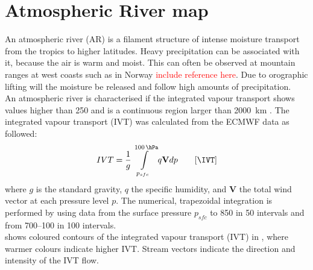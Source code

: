\section{Atmospheric River map}
\label{sec:atm_riv}

An atmospheric river (AR) is a filament structure of intense moisture transport from the tropics to higher latitudes. 
Heavy precipitation can be associated with it, because the air is warm and moist. This can often be observed at mountain ranges at west coasts such as in Norway \textcolor{red}{include reference here}. Due to orographic lifting will the moisture be released and follow high amounts of precipitation.  
\\
An atmospheric river is characterised if the integrated vapour transport shows values higher than \SI{250}{\IVT} and is a continuous region larger than \SI{2000}{\km} \citep{rutz_climatological_2014}.
The integrated vapour transport (IVT) was calculated from the ECMWF data as followed:
\begin{align}
IVT = \frac{1}{g} \int\limits_{p_{sfc}}^{\SI{100}{\hPa}} q \mathbf{V} dp \qquad [\SI{}{\IVT}]
\label{eq:IVT}
\end{align} 
where $g$ is the standard gravity, $q$ the specific humidity, and $\mathbf{V}$ the total wind vector at each pressure level $p$. The numerical, trapezoidal integration is performed by using data from the surface pressure $p_{sfc}$ to \SI{850}{\hPa} in \SI{50}{\hPa} intervals and from \SIrange{700}{100}{\hPa} in \SI{100}{\hPa} intervals.
\\
 shows coloured contours of the integrated vapour transport (IVT) in \SI{}{\IVT}, where warmer colours indicate higher IVT. Stream vectors indicate the direction and intensity of the IVT flow.

%
